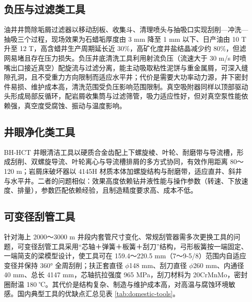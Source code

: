 \subsection{负压与过滤类工具}

油井井筒除垢屑过滤器以移动刮板、收集斗、清理喷头与抽吸口实现刮削—冲洗—抽吸三个过程，现场效果为石蜡垢厚度由 3 mm 降至 1 mm 以下、日产油由 10 T 升至 12 T，高含蜡井生产周期延长近 30\%，高矿化度井盐结晶减少约 80\%，但滤网易堵且存在压力损失。负压井底清洗工具利用射流负压（流速大于 30 m/s 时喷嘴出口接近真空）配旋流与过滤分离，能主动吸取粘性泥饼与重金属屑，可深入缝隙孔洞，且不受重力方向限制而适应水平井；代价是需要大功率动力源，井下密封件易损、维护成本高，清洗范围受负压影响范围限制。真空吸附器同样以顶部驱动头形成局部反循环，配岩屑收集筒与过滤筛管，吸力适应性好，但对真空泵性能依赖强，真空度受腐蚀、振动与温度影响。

\subsection{井眼净化类工具}

BH-HCT 井眼清洁工具以硬质合金齿配上下螺旋棱、叶轮、耐磨带与导流槽，形成刮削、双螺旋导流、叶轮离心与导流槽排屑的多方式协同，有效作用距离 80～120 m；岩屑床破坏器以 4145H 材质本体加螺旋结构与耐磨带，适应直井、斜井与水平井。二者的问题相似：效果高度依赖钻井液性能与操作参数（转速、下放速度、排量），参数匹配依赖经验，且制造精度要求高、成本不低。

\subsection{可变径刮管工具}

针对海上 2000～3000 m 井段内套管尺寸变化、常规刮管器需多次更换工具的问题，可变径刮管工具采用“芯轴＋弹簧＋板簧＋刮刀”结构，弓形板簧按一端固定、一端简支的梁模型设计，使工具可在 159.4～220.5 mm（7\inch～9-5/8\inch）范围内自适应变径并保持 360° 全周刮削；扶正套直径 $\phi$148 mm、刮刀直径 $\phi$260 mm、内通径 40 mm、总长 4147 mm，芯轴抗拉强度 965 MPa，刮刀材料为 20CrMnMo，密封圈耐温 180 ℃。其代价是结构复杂、制造与维护成本高，对高温与腐蚀环境敏感。国内典型工具的优缺点汇总见表 \ref{tab:domestic-tools}。


